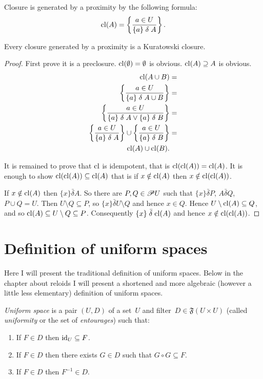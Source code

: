\begin{defn}
Closure is generated by a proximity by the following formula:
\[
\operatorname{cl}(A)=\left\{ \frac{a\in U}{\{a\}\mathrel\delta A}\right\}.
\]
\end{defn}
\begin{prop}
Every closure generated by a proximity is a Kuratowski closure.\end{prop}
\begin{proof}
First prove it is a preclosure. $\operatorname{cl}(\emptyset)=\emptyset$ is obvious.
$\operatorname{cl}(A)\supseteq A$ is obvious.
\begin{align*}
\operatorname{cl}(A\cup B) & =\\
\left\{ \frac{a\in U}{\{a\}\mathrel\delta A\cup B}\right\} & =\\
\left\{ \frac{a\in U}{\{a\}\mathrel\delta A\lor\{a\}\mathrel\delta B}\right\} & =\\
\left\{ \frac{a\in U}{\{a\}\mathrel\delta A}\right\}\cup\left\{ \frac{a\in U}{\{a\}\mathrel\delta B}\right\} & =\\
\operatorname{cl}(A)\cup\operatorname{cl}(B).
\end{align*}


It is remained to prove that $\operatorname{cl}$ is idempotent, that is $\operatorname{cl}(\operatorname{cl}(A))=\operatorname{cl}(A)$.
It is enough to show $\operatorname{cl}(\operatorname{cl}(A))\subseteq\operatorname{cl}(A)$ that is if $x\notin\operatorname{cl}(A)$
then $x\notin\operatorname{cl}(\operatorname{cl}(A))$.

If $x\notin\operatorname{cl}(A)$ then $\{x\}\mathrel{\bar{\delta}}A$. So there
are $P,Q\in\mathscr{P} U$ such that $\{x\}\mathrel{\bar{\delta}}P$,
$A\mathrel{\bar{\delta}}Q$, $P\cup Q=U$. Then $U\setminus Q\subseteq P$,
so $\{x\}\mathrel{\bar{\delta}}U\setminus Q$ and hence $x\in Q$.
Hence $U\setminus\operatorname{cl}(A)\subseteq Q$, and so $\operatorname{cl}(A)\subseteq U\setminus Q\subseteq P$.
Consequently $\{x\}\mathrel{\bar{\delta}}\operatorname{cl}(A)$ and hence $x\notin\operatorname{cl}(\operatorname{cl}(A))$.
\end{proof}

\section{Definition of uniform spaces}

Here I will present the traditional definition of uniform spaces.
Below in the chapter about reloids I will present a shortened and
more algebraic (however a little less elementary) definition of uniform
spaces.
\begin{defn}
\emph{Uniform space} is a pair $(U,D)$ of a set~$U$ and filter~$D\in\mathfrak{F}(U\times U)$
(called \emph{uniformity} or the set of \emph{entourages}) such that:
\begin{enumerate}
\item If $F\in D$ then $\operatorname{id}_{U}\subseteq F$.
\item If $F\in D$ then there exists $G\in D$ such that $G\circ G\subseteq F$.
\item If $F\in D$ then $F^{-1}\in D$.\end{enumerate}
\end{defn}

